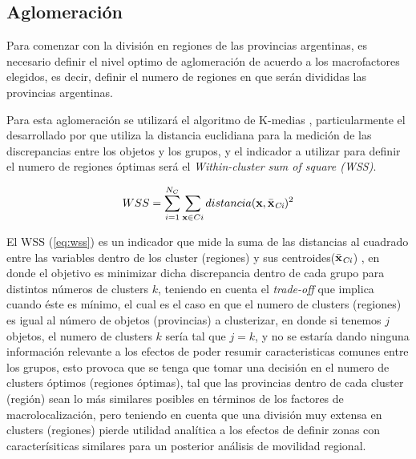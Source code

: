 \documentclass[12pt,a4paper]{article}
\begin{document}
\subsection{Aglomeración}

Para comenzar con la división en regiones de las provincias argentinas, es necesario definir el nivel optimo de aglomeración de acuerdo a los macrofactores elegidos, es decir, definir el numero de regiones en que serán divididas las provincias argentinas.

Para esta aglomeración se utilizará el algoritmo de K-medias \parencite{macqueen_methods_1967}, particularmente el desarrollado por \textcite{hartigan_k-means_1979} que utiliza la distancia euclidiana para la medición de las discrepancias entre los objetos y los grupos, y el indicador a utilizar para definir el numero de regiones óptimas será el \textit{Within-cluster sum of square (WSS)}.

\vspace{5mm}
\begin {center}
\begin{equation}\label{eq:wss}
WSS=\sum_{i=1}^{N_{C}} \sum_{\textbf{x}\in Ci} distancia(\textbf{x},\bar{\textbf{x}}_{\tiny{\textit{Ci}}})^{2}
\end{equation}
\end {center}
\vspace{5mm}


El WSS (\ref{eq:wss}) es un indicador que mide la suma de las distancias al cuadrado entre las variables dentro de  los cluster (regiones) y sus centroides($\bar{\textbf{x}}_{\tiny{\textit{Ci}}}$) , en donde el objetivo es minimizar dicha discrepancia dentro de cada grupo para distintos números de clusters $k$, teniendo en cuenta el \textit{trade-off} que implica cuando éste es mínimo, el cual es el caso en que el numero de clusters (regiones) es igual al número de objetos (provincias) a clusterizar, en donde si tenemos $j$ objetos, el numero de clusters $k$ sería tal que $j=k$, y no se estaría dando ninguna información relevante a los efectos de poder resumir caracteristicas comunes entre los grupos, esto provoca que se tenga que tomar una decisión en el numero de clusters óptimos (regiones óptimas), tal que las provincias dentro de cada cluster (región) sean lo más similares posibles en términos de los factores de macrolocalización, pero teniendo en cuenta que una división muy extensa en clusters (regiones) pierde utilidad analítica a los efectos de definir zonas con caracterísiticas similares para un posterior análisis de movilidad regional.
\end{document}
